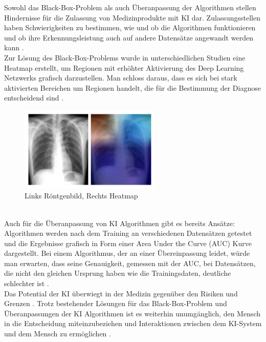 Sowohl das Black-Box-Problem als auch Überanpassung der Algorithmen stellen Hindernisse für die Zulassung von Medizinprodukte mit KI dar. Zulassungsstellen haben Schwierigkeiten zu bestimmen, wie und ob die Algorithmen funktionieren und ob ihre Erkennungsleistung auch auf andere Datensätze angewandt werden kann \cite{AI_where_are_we_now}.\\
Zur Lösung des Black-Box-Problems wurde in unterschiedlichen Studien eine Heatmap erstellt, um Regionen mit erhöhter Aktivierung des Deep Learning Netzwerks grafisch darzustellen. Man schloss daraus, dass es sich bei stark aktivierten Bereichen um Regionen handelt, die für die Bestimmung der Diagnose entscheidend sind \cite{AI_where_are_we_now}.
\begin{figure}[h]
    \centering
    \includegraphics[width=0.6\textwidth]{images/heatmap.jpg}
    \caption{\label{fig:Heatmap}
        Links Röntgenbild, Rechts Heatmap 
        \protect\cite{AI_where_are_we_now}
    }
\end{figure}\\
Auch für die Überanpassung von KI Algorithmen gibt es bereits Ansätze: Algorithmen werden nach dem Training an verschiedenen Datensätzen getestet\cite{AI_where_are_we_now} und die Ergebnisse grafisch in Form einer Area Under the Curve (AUC) Kurve dargestellt. Bei einem Algorithmus, der an einer Übereinpassung leidet, würde man erwarten, dass seine Genauigkeit, gemessen mit der AUC, bei Datensätzen, die nicht den gleichen Ursprung haben wie die Trainingsdaten, deutliche schlechter ist \cite{AI_where_are_we_now}.\\
Das Potential der KI überwiegt in der Medizin  gegenüber den Risiken und Grenzen  \cite{Chapter_14}. Trotz bestehender Lösungen für das Black-Box-Problem und Überanpassungen der KI Algorithmen ist es weiterhin unumgänglich, den Mensch in die Entscheidung miteinzubeziehen und Interaktionen zwischen dem KI-System und dem Mensch zu ermöglichen
\cite{AI_where_are_we_now}.
